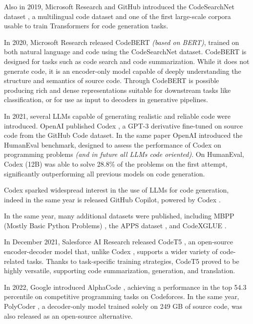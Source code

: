 Also in 2019, Microsoft Research and GitHub introduced the 
CodeSearchNet dataset \cite{husain2019codesearchnet}, a 
multilingual code dataset and one of the first large-scale 
corpora usable to train Transformers for code generation tasks.

In 2020, Microsoft Research released CodeBERT 
\cite{feng2020codebert} \textit{(based on BERT)}, 
trained on both natural 
language and code using the CodeSearchNet dataset. 
CodeBERT is designed for tasks such as code search 
and code summarization. While it does not generate code, 
it is an encoder-only model capable of deeply understanding 
the structure and semantics of source code. Through 
CodeBERT is possible producing rich 
and dense representations suitable for downstream tasks like 
classification, or for use as input to decoders in generative 
pipelines.

In 2021, several LLMs capable of generating realistic and 
reliable code were introduced. OpenAI published Codex 
\cite{chen2021codex}, a GPT-3 \cite{brown2020language} derivative fine-tuned on 
source code from the GitHub Code dataset. In the same paper 
OpenAI introduced the HumanEval benchmark, designed to assess the 
performance of Codex \cite{chen2021codex} on programming problems 
\textit{(and in future all LLMs code oriented)}.
On HumanEval, Codex (12B) was able to solve 28.8\% 
of the problems on the 
first attempt, significantly outperforming all previous 
models on code generation.

Codex \cite{chen2021codex} sparked widespread interest in the use of LLMs 
for code generation, indeed in the same year is released 
GitHub Copilot, powered by Codex \cite{chen2021codex}.

In the same year, 
many additional datasets were 
published, including MBPP (Mostly Basic Python Problems) 
\cite{austin2021program}, the APPS dataset \cite{hendrycks2021measuring}, 
and CodeXGLUE \cite{lu2021codexglue}.

In December 2021, Salesforce AI Research released CodeT5 
\cite{wang2021codet5}, an open-source encoder-decoder 
model that, unlike Codex \cite{chen2021codex}, supports a wider variety of 
code-related tasks. Thanks to task-specific training strategies, 
CodeT5 proved to be highly versatile, supporting code 
summarization, generation, and translation.

In 2022, Google introduced AlphaCode \cite{li2022competition}, 
achieving a performance in the top 54.3 percentile on 
competitive programming tasks on Codeforces. In the same 
year, PolyCoder \cite{xu2022systematic}, a decoder-only 
model trained solely on 249 GB of source code, was also 
released as an open-source alternative. 

